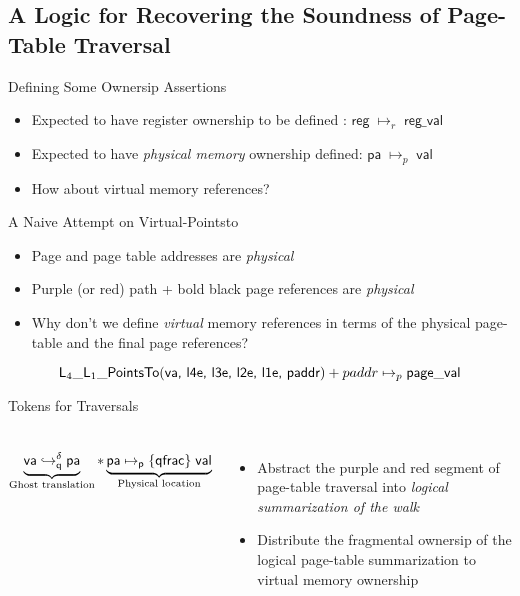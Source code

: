 \documentclass[aspectratio=169,xcolor=dvipsnames]{beamer}
\newcommand{\fracghostmaptoken}[4]{\ensuremath{#2\hookrightarrow^{#1}_{#4}#3}}
\newcommand{\vale}{\textsf{val}}
\begin{document}
\subsection{A Logic for Recovering the Soundness of Page-Table Traversal}
\begin{frame}{Defining Some Ownersip Assertions}
    \begin{itemize}
    \item   Expected to have register ownership to be defined : $\mathsf{reg} \; \mapsto_{r} \; \mathsf{reg\_val}$
        \item Expected to have \emph{physical memory} ownership defined: $\mathsf{pa} \; \mapsto_{p} \; \mathsf{val}$
        \item How about virtual memory references?
    \end{itemize}
\end{frame}
\begin{frame}{A Naive Attempt on Virtual-Pointsto}
    \begin{itemize}
        \item Page and page table addresses are \emph{physical}
        \item Purple (or red) path + bold black page references are \emph{physical}
        \item Why don't we define \emph{virtual} memory references in terms of the physical page-table and the final page references? 
    \end{itemize}
      \[ \textsf{L}_{4}\_\textsf{L}_{1}\_\textsf{PointsTo}(\mathsf{va}\textsf{, l4e, l3e, l2e, l1e, paddr}) + paddr \mapsto_{p} \mathsf{page\_val}\]
% 
\end{frame}
\begin{frame}{Tokens for Traversals} \scriptsize
    \begin{columns}
\[        \underbrace{\fracghostmaptoken{\delta}{\vaddr}{\paddr}{\qfrac} }_\text{Ghost translation} \ast \underbrace{\paddr \mapsto_{\mathsf{p}}\{\textsf{qfrac}\}\; \vale}_\text{Physical location} \]
        \begin{itemize}
            \item Abstract the purple and red segment of page-table traversal into \emph{logical summarization of the walk}
            \item Distribute the fragmental ownersip of the logical page-table summarization to virtual memory ownership
        \end{itemize}
    \end{columns}
\end{frame}
\end{document}
